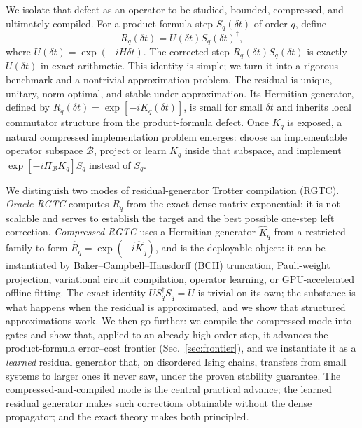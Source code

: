 \documentclass[aps,prxquantum,reprint,superscriptaddress,nofootinbib,amsmath,amssymb]{revtex4-2}
\newcommand{\rgtc}{RGTC}
\newcommand{\cB}{\mathcal{B}}
\newcommand{\dt}{\delta t}
\begin{document}
We isolate that defect as an operator to be studied, bounded, compressed, and ultimately compiled. For a product-formula step $S_q(\dt)$ of order $q$, define
\begin{equation}
    R_q(\dt)=U(\dt)S_q(\dt)^\dagger,
    \label{eq:intro-residual}
\end{equation}
where $U(\dt)=\exp(-iH\dt)$. The corrected step $R_q(\dt)S_q(\dt)$ is exactly $U(\dt)$ in exact arithmetic. This identity is simple; we turn it into a rigorous benchmark and a nontrivial approximation problem. The residual is unique, unitary, norm-optimal, and stable under approximation. Its Hermitian generator, defined by $R_q(\dt)=\exp[-iK_q(\dt)]$, is small for small $\dt$ and inherits local commutator structure from the product-formula defect. Once $K_q$ is exposed, a natural compressed implementation problem emerges: choose an implementable operator subspace $\cB$, project or learn $K_q$ inside that subspace, and implement $\exp[-i\Pi_{\cB}K_q]S_q$ instead of $S_q$.

We distinguish two modes of residual-generator Trotter compilation (\rgtc{}). \emph{Oracle \rgtc{}} computes $R_q$ from the exact dense matrix exponential; it is not scalable and serves to establish the target and the best possible one-step left correction. \emph{Compressed \rgtc{}} uses a Hermitian generator $\widehat K_q$ from a restricted family to form $\widehat R_q=\exp(-i\widehat K_q)$, and is the deployable object: it can be instantiated by Baker--Campbell--Hausdorff (BCH) truncation, Pauli-weight projection, variational circuit compilation, operator learning, or GPU-accelerated offline fitting. The exact identity $US_q^\dagger S_q=U$ is trivial on its own; the substance is what happens when the residual is approximated, and we show that structured approximations work. We then go further: we compile the compressed mode into gates and show that, applied to an already-high-order step, it advances the product-formula error--cost frontier (Sec.~\ref{sec:frontier}), and we instantiate it as a \emph{learned} residual generator that, on disordered Ising chains, transfers from small systems to larger ones it never saw, under the proven stability guarantee. The compressed-and-compiled mode is the central practical advance; the learned residual generator makes such corrections obtainable without the dense propagator; and the exact theory makes both principled.
\end{document}
